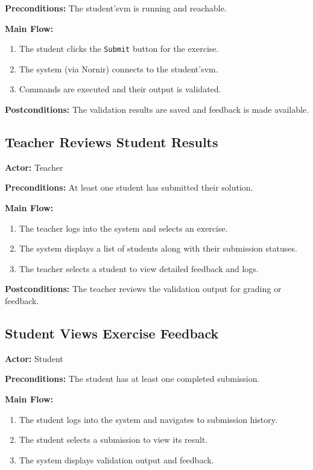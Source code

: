         \textbf{Preconditions:} The student's\ac{vm} is running and reachable.

        \textbf{Main Flow:}
        \begin{enumerate}
            \item The student clicks the \texttt{Submit} button for the exercise.
            \item The system (via Nornir) connects to the student's\ac{vm}.
            \item Commands are executed and their output is validated.
        \end{enumerate}

        \textbf{Postconditions:} The validation results are saved and feedback is made available.

    \subsection{Teacher Reviews Student Results}
        \textbf{Actor:} Teacher

        \textbf{Preconditions:} At least one student has submitted their solution.

        \textbf{Main Flow:}
        \begin{enumerate}
            \item The teacher logs into the system and selects an exercise.
            \item The system displays a list of students along with their submission statuses.
            \item The teacher selects a student to view detailed feedback and logs.
        \end{enumerate}

        \textbf{Postconditions:} The teacher reviews the validation output for grading or feedback.

    \subsection{Student Views Exercise Feedback}
        \textbf{Actor:} Student

        \textbf{Preconditions:} The student has at least one completed submission.

        \textbf{Main Flow:}
        \begin{enumerate}
            \item The student logs into the system and navigates to submission history.
            \item The student selects a submission to view its result.
            \item The system displays validation output and feedback.
        \end{enumerate}

